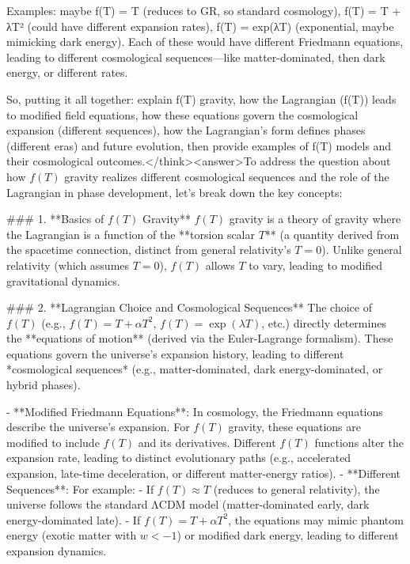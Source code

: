 Examples: maybe f(T) = T (reduces to GR, so standard cosmology), f(T) = T + λT² (could have different expansion rates), f(T) = exp(λT) (exponential, maybe mimicking dark energy). Each of these would have different Friedmann equations, leading to different cosmological sequences—like matter-dominated, then dark energy, or different rates. 

So, putting it all together: explain f(T) gravity, how the Lagrangian (f(T)) leads to modified field equations, how these equations govern the cosmological expansion (different sequences), how the Lagrangian's form defines phases (different eras) and future evolution, then provide examples of f(T) models and their cosmological outcomes.</think><answer>To address the question about how \( f(T) \) gravity realizes different cosmological sequences and the role of the Lagrangian in phase development, let’s break down the key concepts:  


### 1. **Basics of \( f(T) \) Gravity**  
\( f(T) \) gravity is a theory of gravity where the Lagrangian is a function of the **torsion scalar \( T \)** (a quantity derived from the spacetime connection, distinct from general relativity’s \( T = 0 \)). Unlike general relativity (which assumes \( T = 0 \)), \( f(T) \) allows \( T \) to vary, leading to modified gravitational dynamics.  


### 2. **Lagrangian Choice and Cosmological Sequences**  
The choice of \( f(T) \) (e.g., \( f(T) = T + \alpha T^2 \), \( f(T) = \exp(\lambda T) \), etc.) directly determines the **equations of motion** (derived via the Euler-Lagrange formalism). These equations govern the universe’s expansion history, leading to different *cosmological sequences* (e.g., matter-dominated, dark energy-dominated, or hybrid phases).  

- **Modified Friedmann Equations**: In cosmology, the Friedmann equations describe the universe’s expansion. For \( f(T) \) gravity, these equations are modified to include \( f(T) \) and its derivatives. Different \( f(T) \) functions alter the expansion rate, leading to distinct evolutionary paths (e.g., accelerated expansion, late-time deceleration, or different matter-energy ratios).  
- **Different Sequences**: For example:  
  - If \( f(T) \approx T \) (reduces to general relativity), the universe follows the standard ΛCDM model (matter-dominated early, dark energy-dominated late).  
  - If \( f(T) = T + \alpha T^2 \), the equations may mimic phantom energy (exotic matter with \( w < -1 \)) or modified dark energy, leading to different expansion dynamics.  


